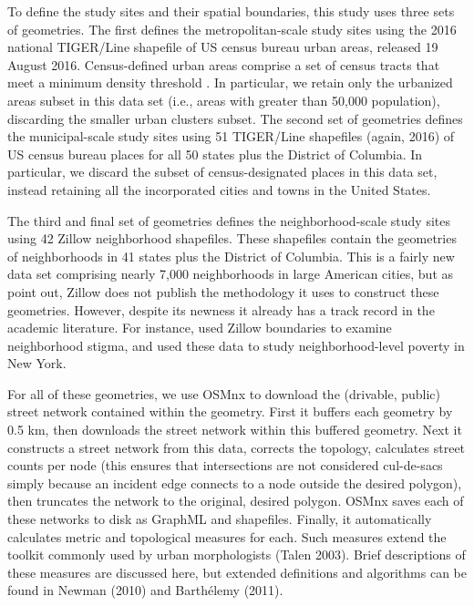 \documentclass{article}
\begin{document}
To define the study sites and their spatial boundaries, this study uses three sets of geometries. The first defines the metropolitan-scale study sites using the 2016 national TIGER/Line shapefile of US census bureau urban areas, released 19 August 2016. Census-defined urban areas comprise a set of census tracts that meet a minimum density threshold \cite{u.s._census_bureau_2010_2010}. In particular, we retain only the urbanized areas subset in this data set (i.e., areas with greater than 50,000 population), discarding the smaller urban clusters subset. The second set of geometries defines the municipal-scale study sites using 51 TIGER/Line shapefiles (again, 2016) of US census bureau places for all 50 states plus the District of Columbia. In particular, we discard the subset of census-designated places in this data set, instead retaining all the incorporated cities and towns in the United States. 

The third and final set of geometries defines the neighborhood-scale study sites using 42 Zillow neighborhood shapefiles. These shapefiles contain the geometries of neighborhoods in 41 states plus the District of Columbia. This is a fairly new data set comprising nearly 7,000 neighborhoods in large American cities, but as \citet{schernthanner_spatial_2016} point out, Zillow does not publish the methodology it uses to construct these geometries. However, despite its newness it already has a track record in the academic literature. For instance, \citet{besbris_effect_2015} used Zillow boundaries to examine neighborhood stigma, and \citet{albrecht_indicator_2014} used these data to study neighborhood-level poverty in New York.

For all of these geometries, we use OSMnx to download the (drivable, public) street network contained within the geometry. First it buffers each geometry by 0.5 km, then downloads the street network within this buffered geometry. Next it constructs a street network from this data, corrects the topology, calculates street counts per node (this ensures that intersections are not considered cul-de-sacs simply because an incident edge connects to a node outside the desired polygon), then truncates the network to the original, desired polygon. OSMnx saves each of these networks to disk as GraphML and shapefiles. Finally, it automatically calculates metric and topological measures for each. Such measures extend the toolkit commonly used by urban morphologists (Talen 2003). Brief descriptions of these measures are discussed here, but extended definitions and algorithms can be found in Newman (2010) and Barthélemy (2011).
\end{document}
